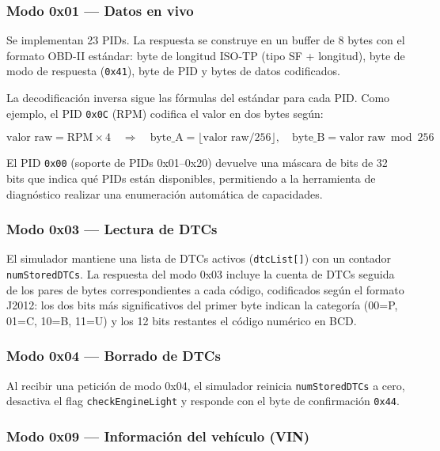 \subsubsection{Modo 0x01 — Datos en vivo}

Se implementan 23 PIDs. La respuesta se construye en un buffer de 8 bytes con el formato OBD-II estándar: byte de longitud ISO-TP (tipo SF + longitud), byte de modo de respuesta (\texttt{0x41}), byte de PID y bytes de datos codificados.

La decodificación inversa sigue las fórmulas del estándar para cada PID. Como ejemplo, el PID \texttt{0x0C} (RPM) codifica el valor en dos bytes según:

\[
    \text{valor raw} = \text{RPM} \times 4 \quad \Rightarrow \quad
    \text{byte\_A} = \lfloor \text{valor raw} / 256 \rfloor, \quad
    \text{byte\_B} = \text{valor raw} \bmod 256
\]

El PID \texttt{0x00} (soporte de PIDs 0x01--0x20) devuelve una máscara de bits de 32 bits que indica qué PIDs están disponibles, permitiendo a la herramienta de diagnóstico realizar una enumeración automática de capacidades.

\subsubsection{Modo 0x03 — Lectura de DTCs}

El simulador mantiene una lista de DTCs activos (\texttt{dtcList[]}) con un contador \texttt{numStoredDTCs}. La respuesta del modo 0x03 incluye la cuenta de DTCs seguida de los pares de bytes correspondientes a cada código, codificados según el formato J2012: los dos bits más significativos del primer byte indican la categoría (00=P, 01=C, 10=B, 11=U) y los 12 bits restantes el código numérico en BCD.

\subsubsection{Modo 0x04 — Borrado de DTCs}

Al recibir una petición de modo 0x04, el simulador reinicia \texttt{numStoredDTCs} a cero, desactiva el flag \texttt{checkEngineLight} y responde con el byte de confirmación \texttt{0x44}.

\subsubsection{Modo 0x09 — Información del vehículo (VIN)}

